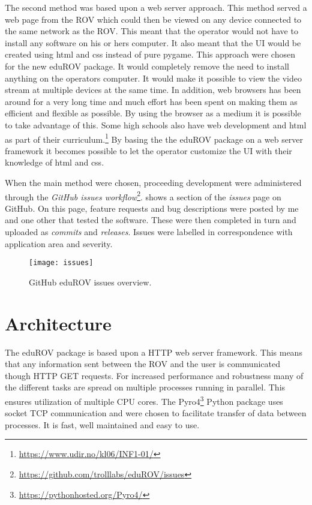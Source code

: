 \vspace{-2mm}
The second method was based upon a web server approach. This method served a web page from the ROV which could then be viewed on any device connected to the same network as the ROV. This meant that the operator would not have to install any software on his or hers computer. It also meant that the UI would be created using html and css instead of pure pygame. This approach were chosen for the new eduROV package. It would completely remove the need to install anything on the operators computer. It would make it possible to view the video stream at multiple devices at the same time. In addition, web browsers has been around for a very long time and much effort has been spent on making them as efficient and flexible as possible. By using the browser as a medium it is possible to take advantage of this. Some high schools also have web development and html as part of their curriculum.\footnote{\url{https://www.udir.no/kl06/INF1-01/}} By basing the the eduROV package on a web server framework it becomes possible to let the operator customize the UI with their knowledge of html and css.

When the main method were chosen, proceeding development were administered through the \emph{GitHub issues workflow}\footnote{\url{https://github.com/trolllabs/eduROV/issues}}.  shows a section of the \emph{issues} page on GitHub. On this page, feature requests and bug descriptions were posted by me and one other that tested the software. These were then completed in turn and uploaded as \textit{commits} and \textit{releases}. Issues were labelled in correspondence with application area and severity. 

\begin{figure}[h!]
    \centering
    \texttt{[image: issues]}
    \caption{GitHub eduROV issues overview.}
    \label{issues}
    \vspace{-5mm}
\end{figure}

\section{Architecture}

The eduROV package is based upon a HTTP web server framework. This means that any information sent between the ROV and the user is communicated though HTTP GET requests. For increased performance and robustness many of the different tasks are spread on multiple processes running in parallel. This ensures utilization of multiple CPU cores. The Pyro4\footnote{\url{https://pythonhosted.org/Pyro4/}} Python package uses socket TCP communication and were chosen to facilitate transfer of data between processes. It is fast, well maintained and easy to use.

